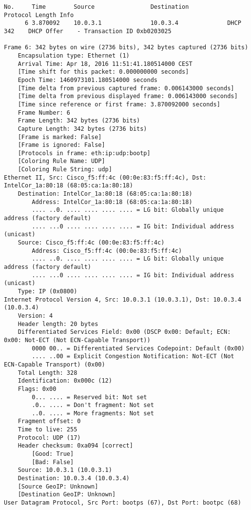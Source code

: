 \begin{lstlisting}
No.     Time        Source                Destination           Protocol Length Info
      6 3.870092    10.0.3.1              10.0.3.4              DHCP     342    DHCP Offer    - Transaction ID 0xb0203025

Frame 6: 342 bytes on wire (2736 bits), 342 bytes captured (2736 bits)
    Encapsulation type: Ethernet (1)
    Arrival Time: Apr 18, 2016 11:51:41.180514000 CEST
    [Time shift for this packet: 0.000000000 seconds]
    Epoch Time: 1460973101.180514000 seconds
    [Time delta from previous captured frame: 0.006143000 seconds]
    [Time delta from previous displayed frame: 0.006143000 seconds]
    [Time since reference or first frame: 3.870092000 seconds]
    Frame Number: 6
    Frame Length: 342 bytes (2736 bits)
    Capture Length: 342 bytes (2736 bits)
    [Frame is marked: False]
    [Frame is ignored: False]
    [Protocols in frame: eth:ip:udp:bootp]
    [Coloring Rule Name: UDP]
    [Coloring Rule String: udp]
Ethernet II, Src: Cisco_f5:ff:4c (00:0e:83:f5:ff:4c), Dst: IntelCor_1a:80:18 (68:05:ca:1a:80:18)
    Destination: IntelCor_1a:80:18 (68:05:ca:1a:80:18)
        Address: IntelCor_1a:80:18 (68:05:ca:1a:80:18)
        .... ..0. .... .... .... .... = LG bit: Globally unique address (factory default)
        .... ...0 .... .... .... .... = IG bit: Individual address (unicast)
    Source: Cisco_f5:ff:4c (00:0e:83:f5:ff:4c)
        Address: Cisco_f5:ff:4c (00:0e:83:f5:ff:4c)
        .... ..0. .... .... .... .... = LG bit: Globally unique address (factory default)
        .... ...0 .... .... .... .... = IG bit: Individual address (unicast)
    Type: IP (0x0800)
Internet Protocol Version 4, Src: 10.0.3.1 (10.0.3.1), Dst: 10.0.3.4 (10.0.3.4)
    Version: 4
    Header length: 20 bytes
    Differentiated Services Field: 0x00 (DSCP 0x00: Default; ECN: 0x00: Not-ECT (Not ECN-Capable Transport))
        0000 00.. = Differentiated Services Codepoint: Default (0x00)
        .... ..00 = Explicit Congestion Notification: Not-ECT (Not ECN-Capable Transport) (0x00)
    Total Length: 328
    Identification: 0x000c (12)
    Flags: 0x00
        0... .... = Reserved bit: Not set
        .0.. .... = Don't fragment: Not set
        ..0. .... = More fragments: Not set
    Fragment offset: 0
    Time to live: 255
    Protocol: UDP (17)
    Header checksum: 0xa094 [correct]
        [Good: True]
        [Bad: False]
    Source: 10.0.3.1 (10.0.3.1)
    Destination: 10.0.3.4 (10.0.3.4)
    [Source GeoIP: Unknown]
    [Destination GeoIP: Unknown]
User Datagram Protocol, Src Port: bootps (67), Dst Port: bootpc (68)

\end{lstlisting}

